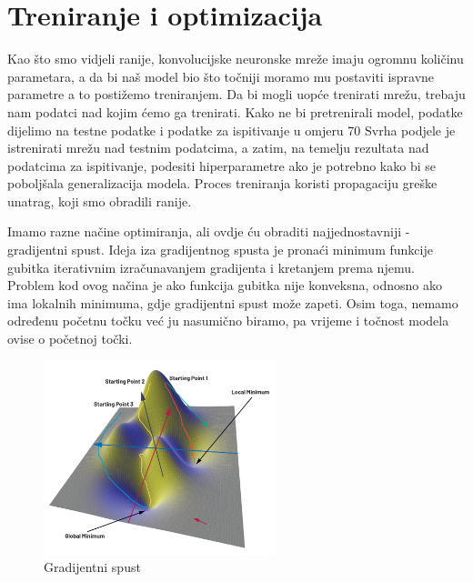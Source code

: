 
\chapter{Treniranje i optimizacija}\label{ch:treniranje-i-optimizacija}

Kao što smo vidjeli ranije, konvolucijske neuronske mreže imaju ogromnu količinu parametara, a da bi naš model bio što točniji moramo mu postaviti ispravne parametre a to postižemo treniranjem.
Da bi mogli uopće trenirati mrežu, trebaju nam podatci nad kojim ćemo ga trenirati.
Kako ne bi pretrenirali model, podatke dijelimo na testne podatke i podatke za ispitivanje u omjeru 70%
Svrha podjele je istrenirati mrežu nad testnim podatcima, a zatim, na temelju rezultata nad podatcima za ispitivanje, podesiti hiperparametre ako je potrebno kako bi se poboljšala generalizacija modela.
Proces treniranja koristi propagaciju greške unatrag, koji smo obradili ranije.

Imamo razne načine optimiranja, ali ovdje ću obraditi najjednostavniji - gradijentni spust.
Ideja iza gradijentnog spusta je pronaći minimum funkcije gubitka iterativnim izračunavanjem gradijenta i kretanjem prema njemu.
Problem kod ovog načina je ako funkcija gubitka nije konveksna, odnosno ako ima lokalnih minimuma, gdje gradijentni spust može zapeti.
Osim toga, nemamo određenu početnu točku već ju nasumično biramo, pa vrijeme i točnost modela ovise o početnoj točki.

\FloatBarrier
\begin{figure}[h]
    \centering
    \includegraphics[width=0.6\textwidth]{images/Gradijentni-spust}
    \caption{Gradijentni spust}
    \label{fig:slika18}
\end{figure}
\FloatBarrier

